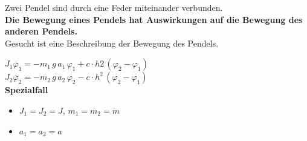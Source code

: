 \begin{minipage}{0.5\linewidth}
    Zwei Pendel sind durch eine Feder miteinander verbunden. \\
    \textbf{Die Bewegung eines Pendels hat Auswirkungen auf die Bewegung des anderen Pendels.} \\
    Gesucht ist eine Beschreibung der Bewegung des Pendels. \\
\end{minipage}
\hfill
\begin{minipage}{0.45\linewidth}
    $ J_1 \ddot{\varphi_1} = -m_1 \, g \, a_1 \, \varphi_1 + c \cdot h2 \, (\varphi_2 - \varphi_1)$ \\
    $ J_2 \ddot{\varphi_2} = -m_2 \, g \,  a_2 \, \varphi_2 - c \cdot h^2 \, (\varphi_2 - \varphi_1)$ \\

    \textbf{Spezialfall}%
    \begin{itemize}
        \item $J_1 = J_2 = J$, $m_1 = m_2 = m$
        \item $a_1 = a_2 = a$
    \end{itemize}
\end{minipage}

